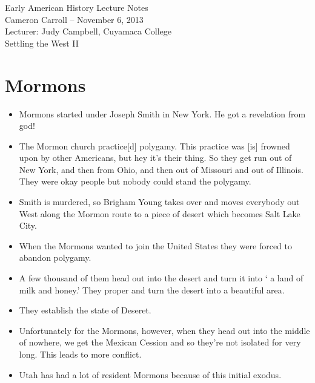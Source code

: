 \documentclass{article}
\begin{document}
\begin{center}
    {\small{} Early American History Lecture Notes} \\[0.6cm]
    {\small{} Cameron Carroll -- November 6, 2013} \\[0.6cm]
    {\small{} Lecturer: Judy Campbell, Cuyamaca College}\\[1cm]
    {\small{} Settling the West II}\\[1cm]
\end{center}
  
\tableofcontents
\newpage

\section{Mormons}
  \begin{itemize}
    \item Mormons started under Joseph Smith in New York. He got a revelation from god! 
    \item The Mormon church practice[d] polygamy. This practice was [is] frowned upon by other Americans, but hey it's their thing. So they get run out of New York, and then from Ohio, and then out of Missouri and out of Illinois. They were okay people but nobody could stand the polygamy.
    \item Smith is murdered, so Brigham Young takes over and moves everybody out West along the Mormon route to a piece of desert which becomes Salt Lake City.
    \item When the Mormons wanted to join the United States they were forced to abandon polygamy.
    \item A few thousand of them head out into the desert and turn it into ` a land of milk and honey.' They proper and turn the desert into a beautiful area. 
    \item They establish the state of Deseret.
    \item Unfortunately for the Mormons, however, when they head out into the middle of nowhere, we get the Mexican Cession and so they're not isolated for very long. This leads to more conflict.
    \item Utah has had a lot of resident Mormons because of this initial exodus.
  \end{itemize}
\end{document}

